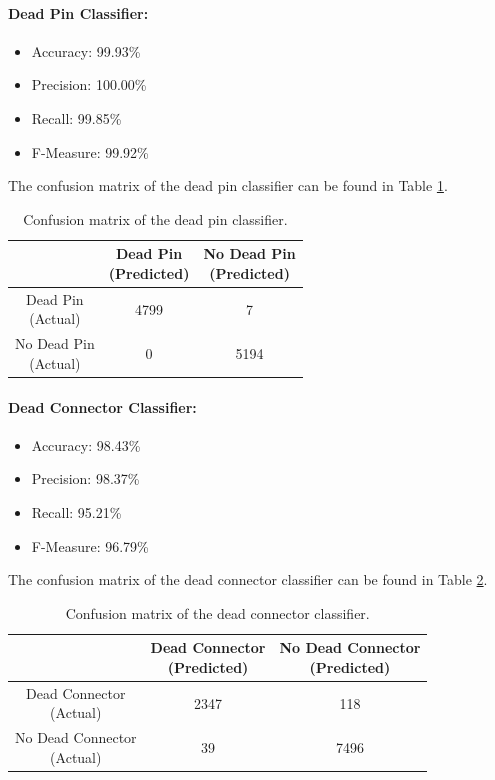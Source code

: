 \paragraph{Dead Pin Classifier:}
\begin{itemize}
  \item Accuracy: 99.93\%
  \item Precision: 100.00\%
  \item Recall: 99.85\%
  \item F-Measure: 99.92\%
\end{itemize}
The confusion matrix of the dead pin classifier can be found in Table
\ref{tbl:confusion-pin}.
\begin{table}[h]
  \centering
  \renewcommand\theadfont{\bfseries}
  \begin{tabular}{|c|c|c|}
    \hline
    & \thead{Dead Pin\\(Predicted)} & \thead{No Dead Pin\\(Predicted)} \\
    \hline
    \thead{Dead Pin\\(Actual)} & 4799 & 7\\
    \hline
    \thead{No Dead Pin\\(Actual)} & 0 & 5194\\
    \hline
  \end{tabular}
  \caption{Confusion matrix of the dead pin classifier.}
  \label{tbl:confusion-pin}
\end{table}

\paragraph{Dead Connector Classifier:}
\begin{itemize}
  \item Accuracy: 98.43\%
  \item Precision: 98.37\%
  \item Recall: 95.21\%
  \item F-Measure: 96.79\%
\end{itemize}
The confusion matrix of the dead connector classifier can be found in
Table \ref{tbl:confusion-connector}.
\begin{table}[h]
  \centering
  \renewcommand\theadfont{\bfseries}
  \begin{tabular}{|c|c|c|}
    \hline
    & \thead{Dead Connector\\(Predicted)} & \thead{No Dead Connector\\(Predicted)} \\
    \hline
    \thead{Dead Connector\\(Actual)} & 2347 & 118 \\
    \hline
    \thead{No Dead Connector\\(Actual)} & 39 & 7496 \\
    \hline
  \end{tabular}
  \caption{Confusion matrix of the dead connector classifier.}
  \label{tbl:confusion-connector}
\end{table}

